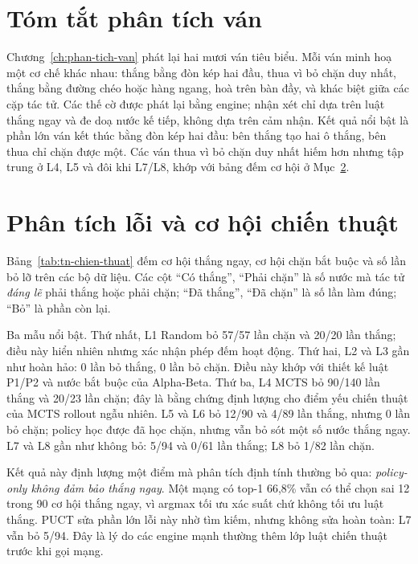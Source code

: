 \section{Tóm tắt phân tích ván}
\label{sec:tn-van}
Chương~\ref{ch:phan-tich-van} phát lại hai mươi ván tiêu biểu. Mỗi ván minh hoạ một cơ chế
khác nhau: thắng bằng đòn kép hai đầu, thua vì bỏ chặn duy nhất, thắng bằng đường chéo hoặc
hàng ngang, hoà trên bàn đầy, và khác biệt giữa các cặp tác tử. Các thế cờ được phát lại bằng
engine; nhận xét chỉ dựa trên luật thắng ngay và đe doạ nước kế tiếp, không dựa trên cảm nhận.
Kết quả nổi bật là phần lớn ván kết thúc bằng đòn kép hai đầu: bên thắng tạo hai ô thắng, bên
thua chỉ chặn được một. Các ván thua vì bỏ chặn duy nhất hiếm hơn nhưng tập trung ở L4, L5 và
đôi khi L7/L8, khớp với bảng đếm cơ hội ở Mục~\ref{sec:tn-loi}.

\section{Phân tích lỗi và cơ hội chiến thuật}
\label{sec:tn-loi}
\begin{table}[H]
  \centering\scriptsize\setlength{\tabcolsep}{2pt}
  \caption{Cơ hội thắng ngay và chặn bắt buộc trên các bộ dữ liệu. Cột ``Bỏ'' là số lần tác tử
  không chọn nước thắng/chặn dù có cơ hội.}
  \label{tab:tn-chien-thuat}
  
\end{table}
Bảng~\ref{tab:tn-chien-thuat} đếm cơ hội thắng ngay, cơ hội chặn bắt buộc và số lần bỏ lỡ trên
các bộ dữ liệu. Các cột ``Có thắng'', ``Phải chặn'' là số nước mà tác tử \emph{đáng lẽ} phải
thắng hoặc phải chặn; ``Đã thắng'', ``Đã chặn'' là số lần làm đúng; ``Bỏ'' là phần còn lại.

Ba mẫu nổi bật. Thứ nhất, L1 Random bỏ 57/57 lần chặn và 20/20 lần thắng; điều này hiển nhiên
nhưng xác nhận phép đếm hoạt động. Thứ hai, L2 và L3 gần như hoàn hảo: 0 lần bỏ thắng, 0 lần bỏ
chặn. Điều này khớp với thiết kế luật P1/P2 và nước bắt buộc của Alpha-Beta. Thứ ba, L4 MCTS bỏ
90/140 lần thắng và 20/23 lần chặn; đây là bằng chứng định lượng cho điểm yếu chiến thuật của
MCTS rollout ngẫu nhiên. L5 và L6 bỏ 12/90 và 4/89 lần thắng, nhưng 0 lần bỏ chặn; policy học
được đã học chặn, nhưng vẫn bỏ sót một số nước thắng ngay. L7 và L8 gần như không bỏ: 5/94 và
0/61 lần thắng; L8 bỏ 1/82 lần chặn.

Kết quả này định lượng một điểm mà phân tích định tính thường bỏ qua: \emph{policy-only không
đảm bảo thắng ngay}. Một mạng có top-1 66,8\% vẫn có thể chọn sai 12 trong 90 cơ hội thắng
ngay, vì argmax tối ưu xác suất chứ không tối ưu luật thắng. PUCT sửa phần lớn lỗi này nhờ tìm
kiếm, nhưng không sửa hoàn toàn: L7 vẫn bỏ 5/94. Đây là lý do các engine mạnh thường thêm lớp
luật chiến thuật trước khi gọi mạng.

